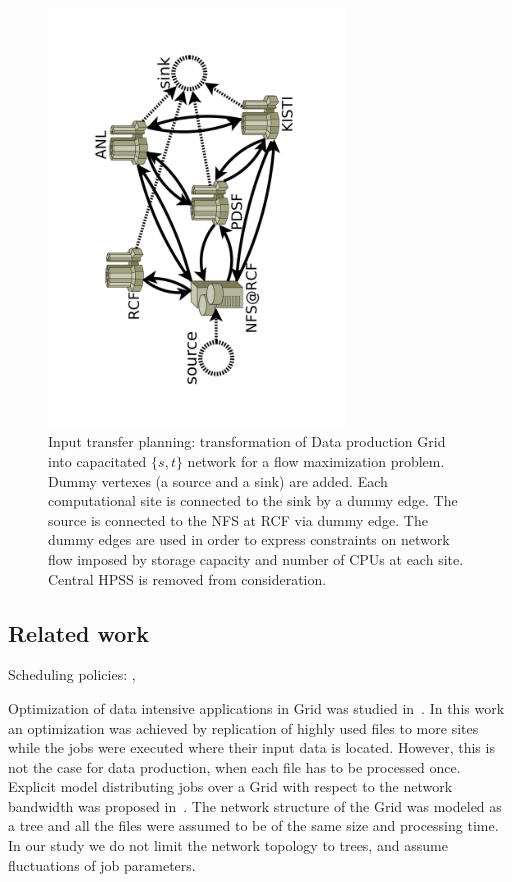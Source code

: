 \documentclass[english]{ddny}
\begin{document}
\begin{figure}[h]
	\begin{center}
		\includegraphics [trim= 30mm 30mm 30mm 30mm , clip, angle =-90, width=0.7\textwidth]{pic/real_network.pdf}
	\end{center}
	\caption{Input transfer planning: transformation of Data production Grid into   capacitated $\{s,t\}$ network for a flow maximization problem. Dummy vertexes (a source and a sink) are added. Each computational site is connected to the sink by a dummy edge. The source is connected to the NFS at RCF via dummy edge. The dummy edges are used in order to express constraints on network flow imposed by storage capacity and number of CPUs at each site.  Central HPSS is removed from consideration.}
	\label{real_network}
\end{figure} 

\subsection{Related work}
Scheduling policies: \cite{Rudova_Tabu_search},

Optimization of data intensive applications in Grid was studied
in~\cite{Globus_scheduler}. In this work an optimization was achieved by
replication of highly used files to more sites while the jobs were executed
where their input data is located. However, this is not the case for data
production, when each file has to be processed once. 
%
Explicit model distributing jobs over a Grid with respect to the network
bandwidth was proposed in~\cite{Trees}. The network structure of the Grid was
modeled as a tree and all the files were assumed to be of the same size and
processing time. In our study we do not limit the network topology to trees,
and assume fluctuations of job parameters. 
\end{document}
